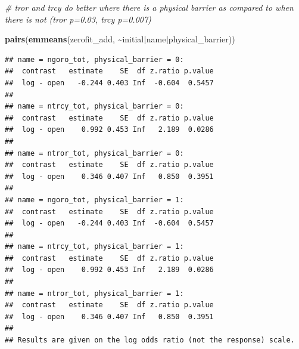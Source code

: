 \documentclass[
]{article}
\newenvironment{Shaded}{\begin{snugshade}}{\end{snugshade}}
\newcommand{\CommentTok}[1]{\textcolor[rgb]{0.56,0.35,0.01}{\textit{#1}}}
\newcommand{\FunctionTok}[1]{\textcolor[rgb]{0.13,0.29,0.53}{\textbf{#1}}}
\newcommand{\NormalTok}[1]{#1}
\newcommand{\SpecialCharTok}[1]{\textcolor[rgb]{0.81,0.36,0.00}{\textbf{#1}}}
\begin{document}
\begin{Shaded}
\begin{Highlighting}[]
\CommentTok{\# tror and trcy do better where there is a physical barrier as compared to when there is not (tror p=0.03, trcy p=0.007)}

\FunctionTok{pairs}\NormalTok{(}\FunctionTok{emmeans}\NormalTok{(zerofit\_add, }\SpecialCharTok{\textasciitilde{}}\NormalTok{initial}\SpecialCharTok{|}\NormalTok{name}\SpecialCharTok{|}\NormalTok{physical\_barrier))}
\end{Highlighting}
\end{Shaded}

\begin{verbatim}
## name = ngoro_tot, physical_barrier = 0:
##  contrast   estimate    SE  df z.ratio p.value
##  log - open   -0.244 0.403 Inf  -0.604  0.5457
## 
## name = ntrcy_tot, physical_barrier = 0:
##  contrast   estimate    SE  df z.ratio p.value
##  log - open    0.992 0.453 Inf   2.189  0.0286
## 
## name = ntror_tot, physical_barrier = 0:
##  contrast   estimate    SE  df z.ratio p.value
##  log - open    0.346 0.407 Inf   0.850  0.3951
## 
## name = ngoro_tot, physical_barrier = 1:
##  contrast   estimate    SE  df z.ratio p.value
##  log - open   -0.244 0.403 Inf  -0.604  0.5457
## 
## name = ntrcy_tot, physical_barrier = 1:
##  contrast   estimate    SE  df z.ratio p.value
##  log - open    0.992 0.453 Inf   2.189  0.0286
## 
## name = ntror_tot, physical_barrier = 1:
##  contrast   estimate    SE  df z.ratio p.value
##  log - open    0.346 0.407 Inf   0.850  0.3951
## 
## Results are given on the log odds ratio (not the response) scale.
\end{verbatim}
\end{document}
